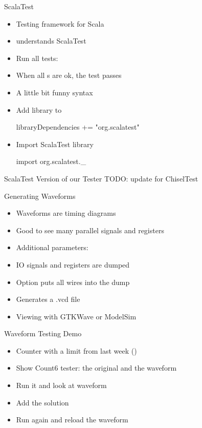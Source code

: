 \begin{frame}[fragile]{ScalaTest}
\begin{itemize}
\item Testing framework for Scala
\item {} understands ScalaTest
\item Run all tests:
\item When all s are ok, the test passes
\item A little bit funny syntax
\item Add library to 
\begin{chisel}
libraryDependencies += "org.scalatest" %
\end{chisel}
\item Import ScalaTest library
\begin{chisel}
import org.scalatest._
\end{chisel}
\end{itemize}
\end{frame}

\begin{frame}[fragile]{ScalaTest Version of our Tester}
TODO: update for ChiselTest
\end{frame}

\begin{frame}[fragile]{Generating Waveforms}
\begin{itemize}
\item Waveforms are timing diagrams
\item Good to see many parallel signals and registers
\item Additional parameters: 
\item IO signals and registers are dumped
\item Option  puts all wires into the dump
\item Generates a .vcd file
\item Viewing with GTKWave or ModelSim
\end{itemize}
\end{frame}


\begin{frame}[fragile]{Waveform Testing Demo}
\begin{itemize}
\item Counter with a limit from last week ()
\item Show Count6 tester: the original and the waveform
\item Run it and look at waveform
\item Add the solution
\item Run again and reload the waveform
\end{itemize}
\end{frame}

